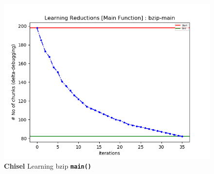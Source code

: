 \documentclass{relatorio}
\begin{document}
\begin{figure}[H]
	\includegraphics[width=1\linewidth]{imgs/plots/chisel_learning_bzip-main_plot.png}
	\caption{\textbf{Chisel} Learning bzip \textbf{\texttt{main()}}}%
	\label{fig:plant}
\end{figure}
\end{document}

